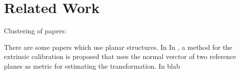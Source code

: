 \documentclass[conference]{IEEEtran}
\begin{document}



\section{Related Work}\label{sec:related_work}


Clustering of papers:

There are some papers which use planar structures. In 
In \cite{Kim2013}, a method for the extrinsic calibration is proposed that uses the normal verctor of two reference planes as metric for estimating the transformation. In blab






\end{document}
